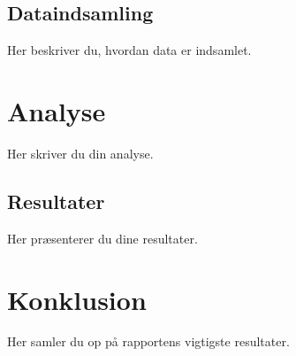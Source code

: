 \documentclass[a4paper,12pt]{article}
\begin{document}
\subsection{Dataindsamling}

Her beskriver du, hvordan data er indsamlet.

\section{Analyse}

Her skriver du din analyse.

\subsection{Resultater}

Her præsenterer du dine resultater.

\section{Konklusion}

Her samler du op på rapportens vigtigste resultater.
\end{document}
